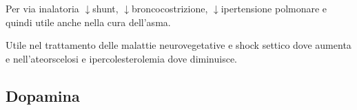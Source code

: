 Per via inalatoria $\downarrow$shunt, $\downarrow$broncocostrizione, $\downarrow$ipertensione polmonare e quindi utile anche nella cura dell'asma.

Utile nel trattamento delle malattie neurovegetative e shock settico dove aumenta e nell'ateorscelosi e ipercolesterolemia dove diminuisce. 

\subsection{Dopamina}

\newpage
